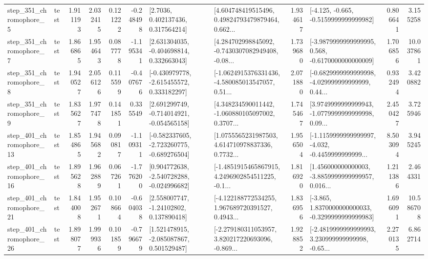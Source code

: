 \begin{tabular}{llrrrrllrlrr}
   step\_351\_chromophore\_5 &      test &      1.911193 &    2.032415 &      0.121222 & -0.248498 &          [2.7036, 0.402137436, 0.317564214] &  [4.604748419515496, 0.49824793479879464, 0.662... &       1.934617 &              [-4.125, -0.665, -0.5159999999999982] &            0.806641 &          3.155258 \\
   step\_351\_chromophore\_7 &      test &      1.866865 &    1.954643 &      0.087778 & -1.195341 &    [2.631304035, -0.404698814, 0.332663043] &  [4.284702998845092, -0.7430307082949408, -0.08... &       1.739680 &  [-3.9879999999999995, 0.568, -0.6170000000000009] &            1.706856 &         10.037861 \\
   step\_351\_chromophore\_8 &      test &      1.940527 &    2.056126 &      0.115599 & -0.407676 &   [-0.430979778, -2.615455572, 0.333182297] &  [-1.0624915376331436, -4.580085013547057, 0.51... &       2.071880 &  [-0.6829999999999998, -4.029999999999999, 0.44... &            0.932494 &          3.420882 \\
   step\_351\_chromophore\_9 &      test &      1.835627 &    1.977478 &      0.141851 &  0.335549 &   [2.691299749, -0.714014921, -0.054565158] &  [4.348234590011442, -1.060880105097002, 0.3707... &       1.745467 &  [3.9749999999999943, -1.0779999999999998, 0.09... &            2.450427 &          3.725946 \\
  step\_401\_chromophore\_13 &      test &      1.854865 &    1.945682 &      0.090817 & -1.109311 &  [-0.582337605, -2.723260775, -0.689276504] &  [1.0755565231987503, 4.614710978837336, 0.7732... &       1.956504 &  [-1.1159999999999997, -4.032, -0.4459999999999... &            8.503094 &          3.945245 \\
  step\_401\_chromophore\_16 &      test &      1.895628 &    1.962889 &      0.067261 & -1.776200 &   [0.904772638, -2.540728288, -0.024996682] &  [-1.4851915465867915, 4.2496902854511225, -0.1... &       1.816920 &  [1.456000000000003, -3.8859999999999957, 0.016... &            1.211386 &          2.464331 \\
  step\_401\_chromophore\_21 &      test &      1.844008 &    1.952671 &      0.108664 & -0.604038 &     [2.558007747, -1.24102802, 0.137890418] &  [-4.122188772534255, 1.967689720391527, 0.4943... &       1.836956 &  [-3.865, 1.8370000000000033, -0.3299999999999983] &            1.696091 &         10.586708 \\
  step\_401\_chromophore\_26 &      test &      1.898077 &    1.999936 &      0.101859 & -0.796679 &    [1.521478915, -2.085087867, 0.501529487] &  [-2.279180311053957, 3.820217220693096, -0.869... &       1.928852 &  [-2.4819999999999993, 3.230999999999998, -0.65... &            2.270135 &          6.862714 \\

\end{tabular}
